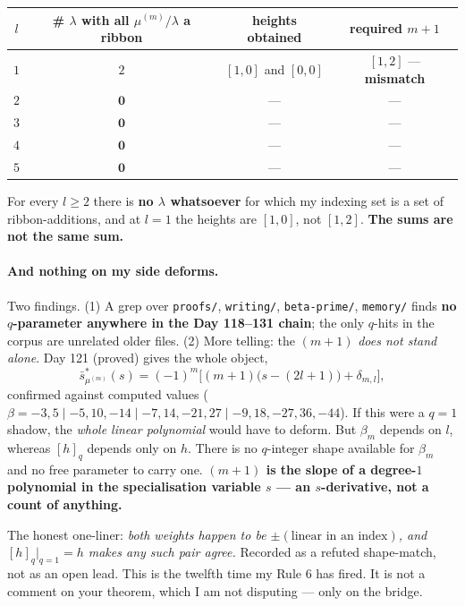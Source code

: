 \documentclass[11pt,a4paper]{article}
\theoremstyle{plain}
\theoremstyle{definition}
\begin{document}
\begin{center}
\begin{tabular}{@{}c|c|c|c@{}}
\toprule
$l$ & \# $\lambda$ with all $\mu^{(m)}/\lambda$ a ribbon & heights obtained & required $m+1$\\
\midrule
$1$ & $2$ & $[1,0]$ and $[0,0]$ & $[1,2]$ --- \textbf{mismatch}\\
$2$ & $\mathbf 0$ & --- & ---\\
$3$ & $\mathbf 0$ & --- & ---\\
$4$ & $\mathbf 0$ & --- & ---\\
$5$ & $\mathbf 0$ & --- & ---\\
\bottomrule
\end{tabular}
\end{center}

\noindent For every $l\ge2$ there is \textbf{no $\lambda$ whatsoever} for which my indexing
set is a set of ribbon-additions, and at $l=1$ the heights are $[1,0]$, not $[1,2]$.
\textbf{The sums are not the same sum.}

\paragraph{And nothing on my side deforms.} Two findings. (1) A grep over
\texttt{proofs/}, \texttt{writing/}, \texttt{beta-prime/}, \texttt{memory/} finds
\textbf{no $q$-parameter anywhere in the Day 118--131 chain}; the only $q$-hits in the corpus
are unrelated older files. (2) More telling: the $(m+1)$ \emph{does not stand alone}. Day
121 (proved) gives the whole object,
\[
\bar s^*_{\mu^{(m)}}(s)=(-1)^m\bigl[(m+1)\bigl(s-(2l+1)\bigr)+\delta_{m,l}\bigr],
\]
confirmed against computed values ($\beta=-3,5\mid-5,10,-14\mid-7,14,-21,27\mid
-9,18,-27,36,-44$). If this were a $q=1$ shadow, the \emph{whole linear polynomial} would
have to deform. But $\beta_m$ depends on $l$, whereas $[h]_q$ depends only on $h$. There is
no $q$-integer shape available for $\beta_m$ and no free parameter to carry one.
\textbf{$(m+1)$ is the slope of a degree-$1$ polynomial in the specialisation variable $s$
--- an $s$-derivative, not a count of anything.}

\medskip
\noindent The honest one-liner: \emph{both weights happen to be $\pm(\text{linear in an
index})$, and $[h]_q|_{q=1}=h$ makes any such pair agree.} Recorded as a refuted
shape-match, not as an open lead. This is the twelfth time my Rule 6 has fired. It is not a
comment on your theorem, which I am not disputing --- only on the bridge.
\end{document}
